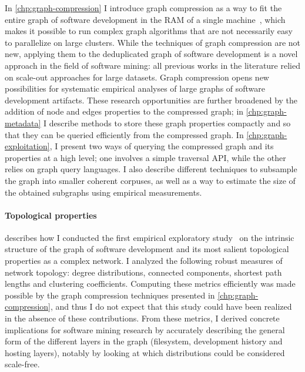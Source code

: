 In \cref{chp:graph-compression} I introduce graph compression as a way to
fit the entire graph of software development in the RAM of a single
machine~\cite{saner-2020-swh-graph}, which makes it possible to run complex
graph algorithms that are not necessarily easy to parallelize on large
clusters. While the techniques of graph compression are not new, applying them
to the deduplicated graph of software development is a novel approach in the
field of software mining: all previous works in the literature relied on
scale-out approaches for large datasets.  Graph compression opens new
possibilities for systematic empirical analyses of large graphs of software
development artifacts. These research opportunities are further broadened by
the addition of node and edges properties to the compressed graph; in
\cref{chp:graph-metadata} I describe methods to store these graph properties
compactly and so that they can be queried efficiently from the compressed
graph. In \cref{chp:graph-exploitation}, I present two ways of querying the
compressed graph and its properties at a high level; one involves a simple
traversal API, while the other relies on graph query languages. I also describe
different techniques to subsample the graph into smaller coherent corpuses, as
well as a way to estimate the size of the obtained subgraphs using empirical
measurements.

\paragraph*{Topological properties}

 describes how I conducted the first empirical exploratory
study~\cite{msr-2020-topology} on the intrinsic structure of the graph of
software development and its most salient topological properties as a complex
network. I analyzed the following robust measures of network topology: degree
distributions, connected components, shortest path lengths and clustering
coefficients.  Computing these metrics efficiently was made possible by the
graph compression techniques presented in \cref{chp:graph-compression}, and
thus I do not expect that this study could have been realized in the absence of
these contributions. From these metrics, I derived concrete implications for
software mining research by accurately describing the general form of the
different layers in the graph (filesystem, development history and hosting
layers), notably by looking at which distributions could be considered
scale-free.

